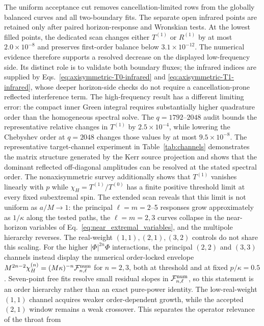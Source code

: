 \documentclass[aps,prd,twocolumn,10pt,nofootinbib,superscriptaddress,floatfix]{revtex4-2}
\begin{document}
The uniform acceptance cut removes cancellation-limited rows from the
globally balanced curves and all two-boundary fits.  The separate open
infrared points are retained only after paired horizon-response and Wronskian
tests.  At the lowest filled points, the
dedicated scan changes either $T^{(1)}$ or $R^{(1)}$ by at most
$2.0\times10^{-8}$ and preserves first-order balance below
$3.1\times10^{-12}$.  The numerical evidence therefore supports a resolved
decrease on the displayed low-frequency side.  Its distinct role is to
validate both boundary fluxes; the infrared indices are supplied by
Eqs.~\eqref{eq:axisymmetric-T0-infrared} and
\eqref{eq:axisymmetric-T1-infrared}, whose deeper horizon-side checks do not
require a cancellation-prone reflected interference term.  The
high-frequency result has a different limiting error: the compact inner Green
integral requires substantially higher quadrature order than the homogeneous
spectral solve.  The $q=1792$--$2048$ audit bounds the representative relative
changes in $T^{(1)}$ by $2.5\times10^{-4}$, while lowering the Chebyshev order
at $q=2048$ changes those values by at most $9.5\times10^{-8}$.  The
representative target-channel experiment in Table~\ref{tab:channels}
demonstrates the matrix structure generated by the Kerr source projection and
shows that the dominant reflected off-diagonal amplitudes can be resolved at
the stated spectral order.  The nonaxisymmetric survey additionally shows
that $T^{(1)}$ vanishes linearly with $p$ while
$\chi_H=T^{(1)}/T^{(0)}$ has a finite positive threshold limit at every fixed
subextremal spin.  The extended scan reveals that this limit is not uniform as
$a/M\to1$: the principal $\ell=m=2$--5 responses grow approximately as
$1/\kappa$ along the tested paths, the $\ell=m=2,3$ curves collapse in the
near-horizon variables of Eq.~\eqref{eq:near_extremal_variables}, and the
multipole hierarchy reverses.  The real-weight $(1,1),(2,1),(3,2)$ controls
do not share this scaling.
For the higher $|\Phi|^{2n}\Phi$ interactions, the principal $(2,2)$ and
$(3,3)$ channels instead display the numerical order-locked envelope
$M^{2n-2}\chi_H^{(n)}=(M\kappa)^{-n}{\cal F}^{\rm num}_{n,\ell}$ for
$n=2,3$, both at threshold and at fixed $p/\kappa=0.5$.  Seven-point free
fits resolve small residual slopes in ${\cal F}^{\rm num}_{n,\ell}$, so this
statement is an order hierarchy rather than an exact pure-power identity.
The low-real-weight $(1,1)$ channel acquires
weaker order-dependent growth, while the accepted $(2,1)$ window remains a
weak crossover.  This separates the operator relevance of the throat from
\end{document}
